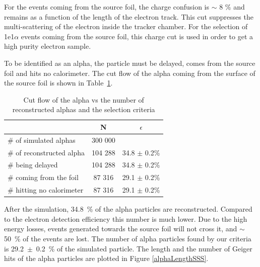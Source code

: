 \documentclass[main.tex]{subfiles}
\begin{document}
\bigskip


\noindent For the events coming from the source foil, the charge confusion is $\sim$ 8 $\%$ and remains as  a function of the length of the electron track. This cut suppresses the multi-scattering of the electron inside the tracker chamber. For the selection of 1e1$\alpha$ events coming from the source foil, this charge cut is used in order to get a high purity electron sample.


\FloatBarrier


\noindent To be identified as an alpha, the particle must be delayed, comes from the source foil and hits no calorimeter. The cut flow of the alpha coming from the surface of the source foil is shown in Table~\ref{Cutflowelectronalpha}.


\begin{table}[h!]
\begin{center}
\begin{tabular}{l|c|c}
 & N & $\epsilon$ \\
\hline
$\#$ of simulated alphas & 300 000 & \\
\hline
$\#$ of reconstructed alpha & 104 288 & 34.8 $\pm$ 0.2\%\\
$\#$ being delayed          & 104 288 & 34.8 $\pm$ 0.2\%\\
$\#$ coming from the foil   & 87 316  & 29.1 $\pm$ 0.2\%\\
$\#$ hitting no calorimeter & 87 316  & 29.1 $\pm$ 0.2\%\\
\end{tabular}
\end{center}
\caption{Cut flow of the alpha vs the number of reconstructed alphas and the selection criteria}
\label{Cutflowelectronalpha}
\end{table}


\bigskip


\noindent After the simulation, 34.8~\% of the alpha particles are reconstructed. Compared to the electron detection efficiency this number is much lower. Due to the high energy losses, events generated towards the source foil will not cross it, and $\sim$50~\% of the events are lost. The number of alpha particles found by our criteria is 29.2~$\pm$~0.2~\% of the simulated particle. The length and the number of Geiger hits of the alpha particles are plotted in Figure \ref{alphaLengthSSS}.


\bigskip
\end{document}
